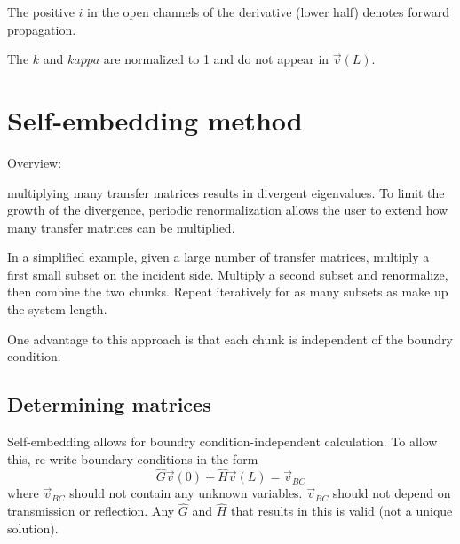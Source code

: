 The positive $i$ in the open channels of the derivative (lower half) denotes forward propagation.

The $k$ and $kappa$ are normalized to 1 and do not appear in $\vec{v}(L)$.

\section {Self-embedding method}

Overview:

multiplying many transfer matrices results in divergent eigenvalues.  To limit the growth of the divergence, periodic renormalization allows the user to extend how many transfer matrices can be multiplied.

In a simplified example, given a large number of transfer matrices, multiply a first small subset on the incident side. Multiply a second subset and renormalize, then combine the two chunks. Repeat iteratively for as many subsets as make up the system length.

One advantage to this approach is that each chunk is independent of the boundry condition.

\subsection {Determining matrices}

Self-embedding allows for boundry condition-independent calculation.  To allow this, re-write boundary conditions in the form 
\begin{equation}
\hat{G}\vec{v}(0)+\hat{H}\vec{v}(L) = \vec{v}_{BC}
\end{equation}
where $\vec{v}_{BC}$ should not contain any unknown variables. $\vec{v}_{BC}$ should not depend on transmission or reflection.  Any $\hat{G}$ and $\hat{H}$ that results in this is valid (not a unique solution). 

